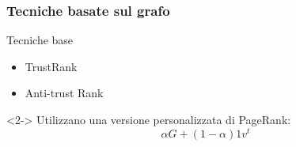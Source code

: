 \documentclass{beamer}
\begin{document}
\begin{frame}
  \frametitle{Tecniche basate sul grafo}
  \begin{block}{Tecniche base}
  \begin{itemize}
  \item TrustRank
  \item Anti-trust Rank
  \end{itemize}
  \end{block}
  \begin{block}<2->{}
  Utilizzano una versione personalizzata di PageRank:
  \begin{equation}
   \alpha G + (1-\alpha)1v^t
   \label{eqn:pagerank}
  \end{equation}
  \end{block}
  \end{frame}
\end{document}
